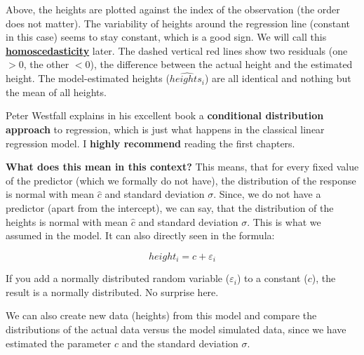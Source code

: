 \documentclass[
]{book}
\begin{document}
Above, the heights are plotted against the index of the observation (the order does not matter).
The variability of heights around the regression line (constant in this case) seems to
stay constant, which is a good sign. We will call this
\href{https://en.wikipedia.org/wiki/Homoscedasticity_and_heteroscedasticity}{\textbf{homoscedasticity}} later.
The dashed vertical red lines show two residuals (one \(>0\), the other \(<0\)), the difference between the actual height
and the estimated height. The model-estimated heights (\(\widehat{heights_i}\))
are all identical and nothing but the mean of all heights.

Peter Westfall explains in his excellent book a \textbf{conditional distribution
approach} to regression, which is just what happens in the classical linear regression model.
I \textbf{highly recommend} reading the first chapters.

\textbf{What does this mean in this context?}
This means, that for every fixed value of the predictor (which we formally do not have),
the distribution of the response is normal with mean \(\hat{c}\) and standard deviation \(\sigma\).
Since, we do not have a predictor (apart from the intercept), we can say, that the distribution of the heights is normal with mean \(\hat{c}\)
and standard deviation \(\sigma\). This is what we assumed in the model. It can also directly seen
in the formula:

\[ height_i = c + \varepsilon_i \]

If you add a normally distributed random variable (\(\varepsilon_i\)) to a constant (\(c\)),
the result is a normally distributed. No surprise here.

We can also create new data (heights) from this model and compare the distributions
of the actual data versus the model simulated data, since we have estimated the
parameter \(c\) and the standard deviation \(\sigma\).
\end{document}
